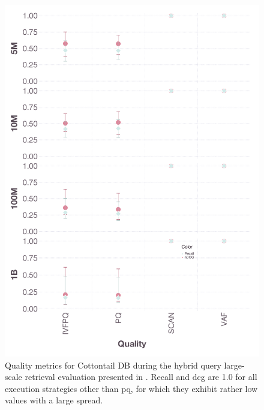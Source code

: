 \begin{figure}[p]
    \includegraphics[width=\linewidth]{figures/bignns-cottontail-quality-Hybrid}
    \caption{Quality metrics for Cottontail DB during the hybrid query large-scale retrieval evaluation presented in . Recall and \acrshort{dcg} are 1.0 for all execution strategies other than \acrshort{pq}, for which they exhibit rather low values with a large spread.}
    \label{figure:appendix_bignns_cottontail_hybrid_quality}
\end{figure}
